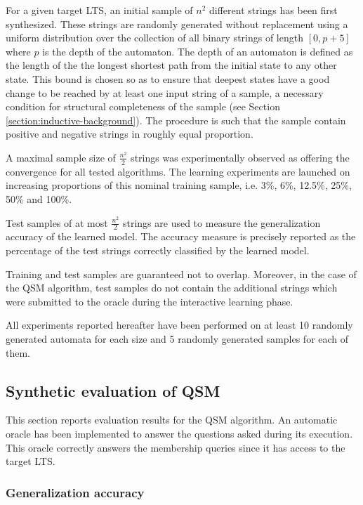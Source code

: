 For a given target LTS, an initial sample of $n^2$ different strings has been first synthesized. These strings are randomly generated without replacement using a uniform distribution over the collection of all binary strings of length $[0, p+5]$ where $p$ is the depth of the automaton. The depth of an automaton is defined as the length of the the longest shortest path from the initial state to any other state. This bound is chosen so as to ensure that deepest states have a good change to be reached by at least one input string of a sample, a necessary condition for structural completeness of the sample (see Section \ref{section:inductive-background}). The procedure is such that the sample contain positive and negative strings in roughly equal proportion.
 
A maximal sample size of $\frac{n^2}{2}$ strings was experimentally observed as offering the convergence for all tested algorithms. The learning experiments are launched on increasing proportions of this nominal training sample, i.e. 3\%, 6\%, 12.5\%, 25\%, 50\% and 100\%.

Test samples of at most $\frac{n^2}{2}$ strings are used to measure the generalization accuracy of the learned model. The accuracy measure is precisely reported as the percentage of the test strings correctly classified by the learned model.

Training and test samples are guaranteed not to overlap. Moreover, in the case of the QSM algorithm, test samples do not contain the additional strings which were submitted to the oracle during the interactive learning phase.

All experiments reported hereafter have been performed on at least 10 randomly generated automata for each size and 5 randomly generated samples for each of them.

\subsection{Synthetic evaluation of QSM}

This section reports evaluation results for the QSM algorithm. An automatic oracle has been implemented to answer the questions asked during its execution. This oracle correctly answers the membership queries since it has access to the target LTS.

\subsubsection*{Generalization accuracy}

